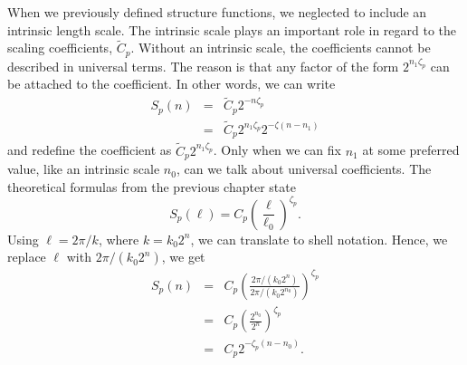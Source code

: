 When we previously defined structure functions, we neglected to include an intrinsic length scale.  The intrinsic scale plays an important role in regard to the scaling coefficients, $\tilde{C}_p$. Without an intrinsic scale, the coefficients cannot be described in universal terms.  The reason is that any factor of the form $2^{n_1\zeta_p}$ can be attached to the coefficient.  In other words, we can write
\begin{eqnarray}
    S_p(n) & = & \tilde{C}_p2^{-n\zeta_p} \nonumber \\
    & = & \tilde{C}_p2^{n_1\zeta_p}2^{-\zeta(n-n_1)}
\end{eqnarray}
and redefine the coefficient as $\tilde{C}_p2^{n_1\zeta_p}$.  Only when we can fix $n_1$ at some preferred value, like an intrinsic scale $n_0$, can we talk about universal coefficients. The theoretical formulas from the previous chapter \cite{Melander2007} state
\begin{equation}
    S_{p}(\ell) = C_{p}\left(\frac{\ell}{\ell_{0}}\right)^{\zeta_{p}}.
\end{equation}
Using $\ell = 2\pi/k$, where $k = k_{0}2^{n}$, we can translate to shell notation.  Hence, we replace $\ell$ with $2\pi/(k_{0}2^{n})$, we get
\begin{eqnarray}
    S_{p}(n) & = & C_{p}\left(\frac{2\pi/(k_{0}2^{n})}{2\pi/(k_{0}2^{n_{0}})}\right)^{\zeta_{p}} \nonumber \\
    & = & C_{p}\left(\frac{2^{n_{0}}}{2^{n}}\right)^{\zeta_{p}} \nonumber \\
    & = & C_{p}2^{-\zeta_{p}(n-n_{0})} . \label{eq: new sfp}
\end{eqnarray}

